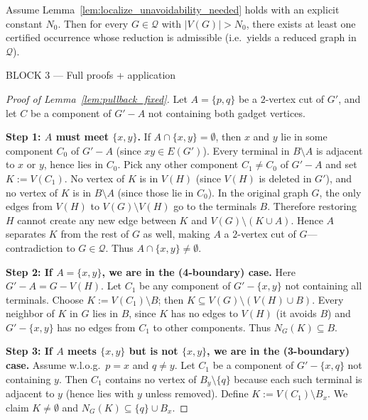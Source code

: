 \begin{lemma}\label{lem:admissible_bridge_fixed}
Assume Lemma~\ref{lem:localize_unavoidability_needed} holds with an explicit constant $N_0$.
Then for every $G\in\mathcal Q$ with $|V(G)|>N_0$, there exists at least one certified occurrence whose reduction is admissible (i.e.\ yields a reduced graph in $\mathcal Q$).
\end{lemma}

BLOCK 3 — Full proofs + application

\begin{proof}[Proof of Lemma~\ref{lem:pullback_fixed}]
Let $A=\{p,q\}$ be a $2$-vertex cut of $G'$, and let $C$ be a component of $G'-A$ not containing both gadget vertices.

\medskip
\noindent\textbf{Step 1: $A$ must meet $\{x,y\}$.}
If $A\cap\{x,y\}=\emptyset$, then $x$ and $y$ lie in some component $C_0$ of $G'-A$ (since $xy\in E(G')$).
Every terminal in $B\setminus A$ is adjacent to $x$ or $y$, hence lies in $C_0$.
Pick any other component $C_1\neq C_0$ of $G'-A$ and set $K:=V(C_1)$.
No vertex of $K$ is in $V(H)$ (since $V(H)$ is deleted in $G'$), and no vertex of $K$ is in $B\setminus A$ (since those lie in $C_0$).
In the original graph $G$, the only edges from $V(H)$ to $V(G)\setminus V(H)$ go to the terminals $B$.
Therefore restoring $H$ cannot create any new edge between $K$ and $V(G)\setminus (K\cup A)$.
Hence $A$ separates $K$ from the rest of $G$ as well, making $A$ a $2$-vertex cut of $G$—contradiction to $G\in\mathcal Q$.
Thus $A\cap\{x,y\}\neq\emptyset$.

\medskip
\noindent\textbf{Step 2: If $A=\{x,y\}$, we are in the (4-boundary) case.}
Here $G'-A = G - V(H)$.
Let $C_1$ be any component of $G'-\{x,y\}$ not containing all terminals.
Choose $K:=V(C_1)\setminus B$; then $K\subseteq V(G)\setminus (V(H)\cup B)$.
Every neighbor of $K$ in $G$ lies in $B$, since $K$ has no edges to $V(H)$ (it avoids $B$) and $G'-\{x,y\}$ has no edges from $C_1$ to other components.
Thus $N_G(K)\subseteq B$.

\medskip
\noindent\textbf{Step 3: If $A$ meets $\{x,y\}$ but is not $\{x,y\}$, we are in the (3-boundary) case.}
Assume w.l.o.g.\ $p=x$ and $q\neq y$.
Let $C_1$ be a component of $G'-\{x,q\}$ not containing $y$.
Then $C_1$ contains no vertex of $B_y\setminus\{q\}$ because each such terminal is adjacent to $y$ (hence lies with $y$ unless removed).
Define $K:=V(C_1)\setminus B_x$.
We claim $K\neq\emptyset$ and $N_G(K)\subseteq \{q\}\cup B_x$.


\end{proof}
